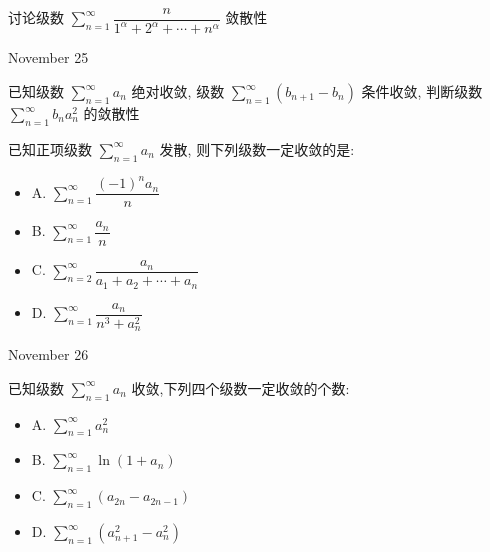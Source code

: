 \begin{solution}
	
\end{solution}

\begin{example}[][Exam: 37.4.6]
	讨论级数 $\sum\limits_{n=1}^{\infty}\dfrac{n}{1^{\alpha}+2^{\alpha}+\cdots+n^{\alpha}}$ 敛散性
\end{example}

\begin{solution}
	
\end{solution}


\textcolor{purplea}{November 25}

\begin{example}[][Exam: 37.4.7]
	已知级数 $\sum\limits_{n=1}^{\infty}a_{n}$ 绝对收敛,
级数 $\sum\limits_{n=1}^{\infty}(b_{n+1}-b_{n})$ 条件收敛,
判断级数 $\sum\limits_{n=1}^{\infty}b_{n}a_{n}^{2}$ 的敛散性
\end{example}

\begin{solution}
	
\end{solution}

 \begin{example}[][Exam: 37.4.8]
	已知正项级数 $\sum\limits_{n=1}^{\infty}a_{n}$ 发散, 则下列级数一定收敛的是:
\begin{itemize}
	\item A. $\sum\limits_{n=1}^{\infty}\dfrac{(-1)^{n}a_{n}}{n}$
	\item B. $\sum\limits_{n=1}^{\infty}\dfrac{a_{n}}{n}$
	\item C. $\sum\limits_{n=2}^{\infty}\dfrac{a_{n}}{a_{1}+a_{2}+\cdots+a_{n}}$
	\item D. $\sum\limits_{n=1}^{\infty}\dfrac{a_{n}}{n^{3}+a_{n}^{2}}$
\end{itemize}
\end{example}

\begin{solution}
	
\end{solution}


\textcolor{purplea}{November 26}

\begin{example}[][Exam: 37.4.9]
	已知级数 $\sum\limits_{n=1}^{\infty}a_{n}$ 收敛,下列四个级数一定收敛的个数:
\begin{itemize}
	\item A. $\sum\limits_{n=1}^{\infty}a_{n}^{2}$
	\item B. $\sum\limits_{n=1}^{\infty}\ln(1+a_{n})$
	\item C. $\sum\limits_{n=1}^{\infty}(a_{2n}-a_{2n-1})$
	\item D. $\sum\limits_{n=1}^{\infty}(a_{n+1}^{2}-a_{n}^{2})$
\end{itemize}
\end{example}

